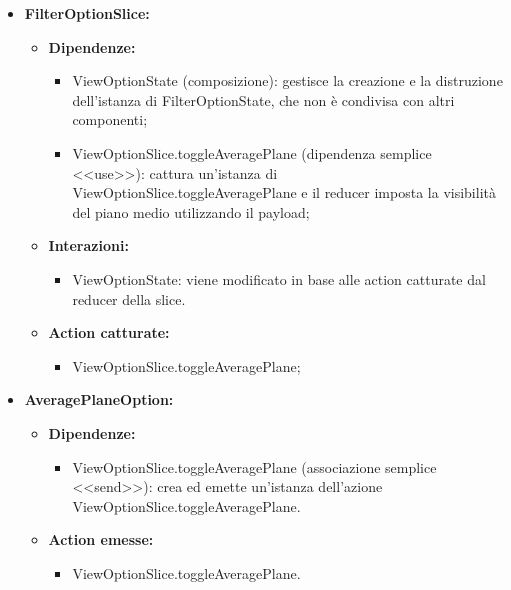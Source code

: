 \begin{itemize}
    \item \textbf{FilterOptionSlice:}
    \begin{itemize}
        \item \textbf{Dipendenze:}
        \begin{itemize}
            \item ViewOptionState (composizione): gestisce la creazione e la distruzione dell'istanza di FilterOptionState, che non è condivisa con altri componenti;
            \item ViewOptionSlice.toggleAveragePlane (dipendenza semplice <<use>>): cattura un’istanza di ViewOptionSlice.toggleAveragePlane e il reducer imposta la visibilità del piano medio utilizzando il payload;   
        \end{itemize} 
        \item \textbf{Interazioni:}
        \begin{itemize}
            \item ViewOptionState: viene modificato in base alle action catturate dal reducer della slice.
        \end{itemize} 
        \item \textbf{Action catturate:}
        \begin{itemize}
            \item ViewOptionSlice.toggleAveragePlane;
        \end{itemize} 
    \end{itemize}


    \item \textbf{AveragePlaneOption:}
    \begin{itemize}
        \item \textbf{Dipendenze:}
        \begin{itemize}
            \item ViewOptionSlice.toggleAveragePlane (associazione semplice <<send>>): crea ed emette un’istanza dell’azione ViewOptionSlice.toggleAveragePlane.
        \end{itemize}
        \item \textbf{Action emesse:}
        \begin{itemize}
            \item ViewOptionSlice.toggleAveragePlane.
        \end{itemize}  
    \end{itemize}


\end{itemize}
